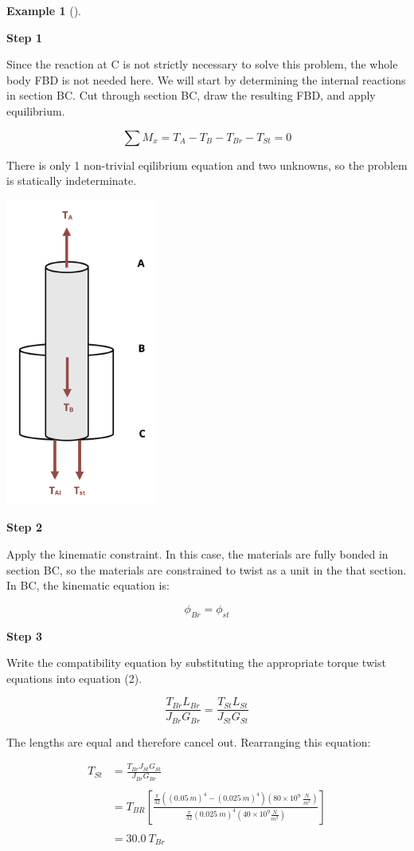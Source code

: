 \documentclass[
  letterpaper,
  DIV=11,
  numbers=noendperiod]{scrreprt}
\theoremstyle{definition}
\newtheorem{example}{Example}[chapter]
\theoremstyle{remark}
\begin{document}
\begin{tcolorbox}
\begin{example}[]
\begin{tcolorbox}
\textbf{Step 1}

Since the reaction at C is not strictly necessary to solve this problem,
the whole body FBD is not needed here. We will start by determining the
internal reactions in section BC. Cut through section BC, draw the
resulting FBD, and apply equilibrium.

\[
\sum M_x=T_A-T_B-T_{Br}-T_{St}=0
\]

There is only 1 non-trivial eqilibrium equation and two unknowns, so the
problem is statically indeterminate.

\begin{center}
\includegraphics[width=1.96875in,height=3.98958in]{images/CH6 PNGs/example 6.6 part 2.png}
\end{center}

\textbf{Step 2}

Apply the kinematic constraint. In this case, the materials are fully
bonded in section BC, so the materials are constrained to twist as a
unit in the that section. In BC, the kinematic equation is:

\[
\phi_{B r}=\phi_{s t}
\]

\textbf{Step 3}

Write the compatibility equation by substituting the appropriate torque
twist equations into equation (2).

\[
\frac{T_{Br}L_{Br}}{J_{Br}G_{Br}}=\frac{T_{St}L_{St}}{J_{St}G_{St}}
\]

The lengths are equal and therefore cancel out. Rearranging this
equation:

\[
\begin{aligned}
T_{St}&=\frac{T_{Br}J_{St}G_{St}}{J_{Br}G_{Br}} \\
\\
&=T_{BR}\left[\frac{\frac{\pi}{32}\left((0.05{~m})^4-(0.025{~m})^4\right)\left(80 \times 10^9~\frac{{N}}{{m}^2}\right)}{\frac{\pi}{32}(0.025{~m})^4\left(40 \times 10^9 \frac{{N}}{{m}^2}\right)}\right] \\
\\
&=30.0~T_{Br}
\end{aligned}
\]


\end{tcolorbox}
\end{example}
\end{tcolorbox}
\end{document}
